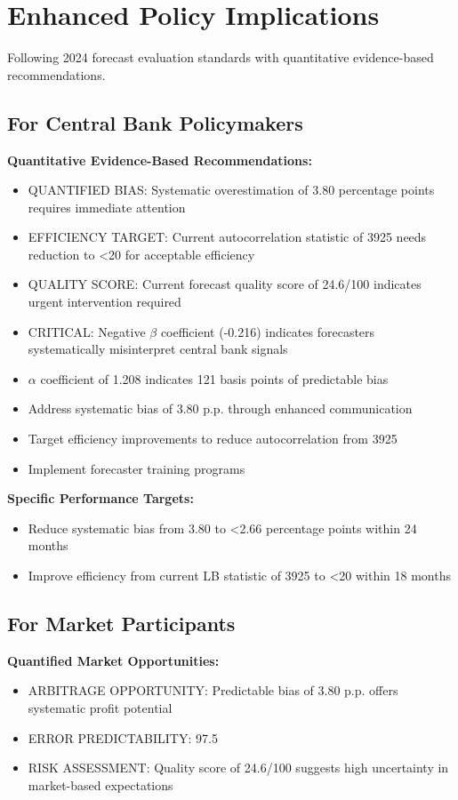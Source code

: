 \documentclass[11pt,a4paper]{article}
\begin{document}
\section{Enhanced Policy Implications}

Following 2024 forecast evaluation standards with quantitative evidence-based recommendations.

\subsection{For Central Bank Policymakers}
\textbf{Quantitative Evidence-Based Recommendations:}

\begin{itemize}
\item QUANTIFIED BIAS: Systematic overestimation of 3.80 percentage points requires immediate attention
\item EFFICIENCY TARGET: Current autocorrelation statistic of 3925 needs reduction to <20 for acceptable efficiency
\item QUALITY SCORE: Current forecast quality score of 24.6/100 indicates urgent intervention required
\item CRITICAL: Negative $\beta$ coefficient (-0.216) indicates forecasters systematically misinterpret central bank signals
\item $\alpha$ coefficient of 1.208 indicates 121 basis points of predictable bias
\item Address systematic bias of 3.80 p.p. through enhanced communication
\item Target efficiency improvements to reduce autocorrelation from 3925
\item Implement forecaster training programs
\end{itemize}

\textbf{Specific Performance Targets:}
\begin{itemize}
\item Reduce systematic bias from 3.80 to <2.66 percentage points within 24 months
\item Improve efficiency from current LB statistic of 3925 to <20 within 18 months
\end{itemize}

\subsection{For Market Participants}
\textbf{Quantified Market Opportunities:}

\begin{itemize}
\item ARBITRAGE OPPORTUNITY: Predictable bias of 3.80 p.p. offers systematic profit potential
\item ERROR PREDICTABILITY: 97.5%
\item RISK ASSESSMENT: Quality score of 24.6/100 suggests high uncertainty in market-based expectations
\end{itemize}
\end{document}
